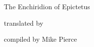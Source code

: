 



\begin{titlepage}


    \noindent
        \makebox[0pt][l]{\rule{1.3\textwidth}{1pt}}

    \color{black}\noindent
        \textsf{\Huge{The Enchiridion of Epictetus}}

    \color{black}\noindent
        \textsf{translated by \AuthorFull}

    \vfill

    \color{white}\noindent
        \textsf{compiled by Mike Pierce}

\end{titlepage}



